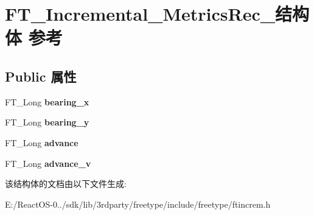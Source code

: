 \hypertarget{struct_f_t___incremental___metrics_rec__}{}\section{F\+T\+\_\+\+Incremental\+\_\+\+Metrics\+Rec\+\_\+结构体 参考}
\label{struct_f_t___incremental___metrics_rec__}
\subsection*{Public 属性}
\begin{DoxyCompactItemize}
\item 
\mbox{\label{struct_f_t___incremental___metrics_rec___af065d998d0a0f2a57513125038d802a6}} 
F\+T\+\_\+\+Long {\bfseries bearing\+\_\+x}
\item 
\mbox{\label{struct_f_t___incremental___metrics_rec___af1443aa7c1ca54d3c2a29f1cf6d7848b}} 
F\+T\+\_\+\+Long {\bfseries bearing\+\_\+y}
\item 
\mbox{\label{struct_f_t___incremental___metrics_rec___a996c99aa0e6b36c2c7776fc1a2b6b614}} 
F\+T\+\_\+\+Long {\bfseries advance}
\item 
\mbox{\label{struct_f_t___incremental___metrics_rec___a0ee280662a03ea935dbfe377e56f4d6d}} 
F\+T\+\_\+\+Long {\bfseries advance\+\_\+v}
\end{DoxyCompactItemize}


该结构体的文档由以下文件生成\+:\begin{DoxyCompactItemize}
\item 
E\+:/\+React\+O\+S-\/0../sdk/lib/3rdparty/freetype/include/freetype/ftincrem.\+h\end{DoxyCompactItemize}

